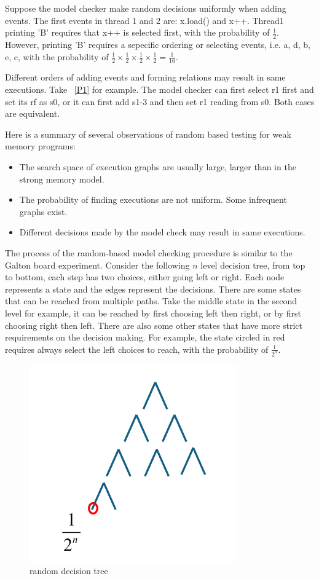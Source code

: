 Suppose the model checker make random decisions uniformly when adding events. The first events in thread 1 and 2 are: x.load() and x++. Thread1 printing 'B' requires that x++ is selected first, with the probability of $\frac{1}{2}$. However, printing 'B' requires a sepecific ordering or selecting events, i.e. {a, d, b, e, c}, with the probability of $\frac{1}{2} \times \frac{1}{2}  \times \frac{1}{2}  \times \frac{1}{2} =  \frac{1}{16}$.


Different orders of adding events and forming relations may result in same executions. Take ~\ref{P1} for example. The model checker can first select r1 first and set its rf as s0, or it can first add s1-3 and then set r1 reading from s0. Both cases are equivalent.

Here is a summary of several observations of random based testing for weak memory programs:
\begin{itemize}
    \item The search space of execution graphs are usually large, larger than in the strong memory model.
    \item The probability of finding executions are not uniform. Some infrequent graphs exist.
    \item Different decisions made by the model check may result in same executions.
\end{itemize}

The process of the random-based model checking procedure is similar to the Galton board experiment. Consider the following $n$ level decision tree, from top to bottom, each step has two choices, either going left or right. Each node represents a state and the edges represent the decisions. There are some states that can be reached from multiple paths. Take the middle state in the second level for example, it can be reached by first choosing left then right, or by first choosing right then left. There are also some other states that have more strict requirements on the decision making. For example, the state circled in red requires always select the left choices to reach, with the probability of $\frac{1}{2^n}$. 
\begin{figure}[htbp] %
    \centering
    \includegraphics[scale=0.5]{figure/tree.pdf} %
    \caption{random decision tree} %
    \label{tree} %
\end{figure}


